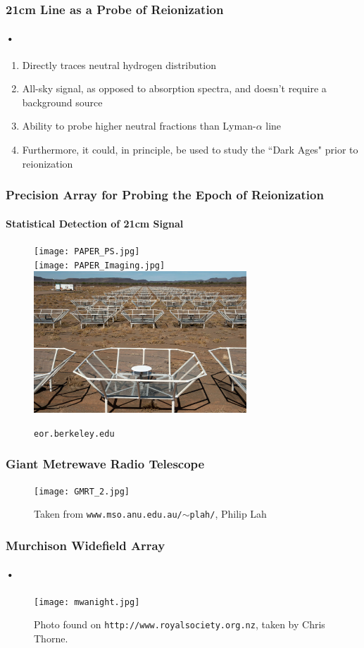 \documentclass{beamer}
\begin{document}
\begin{frame}
\frametitle{21cm Line as a Probe of Reionization}
\framesubtitle{•}
\begin{enumerate}[-]
\item Directly traces neutral hydrogen distribution
\item All-sky signal, as opposed to absorption spectra, and doesn't require a background source
\item Ability to probe higher neutral fractions than Lyman-$\alpha$ line
\item Furthermore, it could, in principle, be used to study the ``Dark Ages" prior to reionization
\end{enumerate}
\end{frame}

\begin{frame}
\frametitle{Precision Array for Probing the Epoch of Reionization}
\framesubtitle{Statistical Detection of 21cm Signal}
\begin{figure}[h]
  \centering
  \texttt{[image: PAPER\_PS.jpg]}\\
  \texttt{[image: PAPER\_Imaging.jpg]}\\
  \includegraphics[width=8cm]{PAPER.jpg} 
  \caption{{\tt eor.berkeley.edu}}
  \label{fig:todo}
\end{figure}
\end{frame}

\begin{frame}
\frametitle{Giant Metrewave Radio Telescope}
\begin{figure}[h]
  \centering
  \texttt{[image: GMRT\_2.jpg]}
  \caption{Taken from {\tt www.mso.anu.edu.au/$\sim$plah/}, Philip Lah}
  \label{fig:todo}
\end{figure}
\end{frame}

\begin{frame}
\frametitle{Murchison Widefield Array}
\framesubtitle{•}
\begin{figure}[h]
  \centering
  \texttt{[image: mwanight.jpg]}
  \caption{Photo found on {\tt http://www.royalsociety.org.nz}, taken by Chris Thorne.}
  \label{fig:todo}
\end{figure}
\end{frame}
\end{document}
